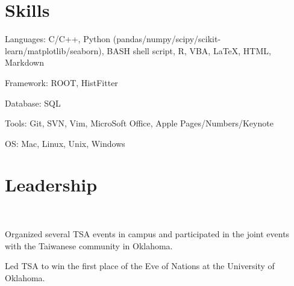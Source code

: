 \documentclass[letterpaper]{deedy-resume-openfont}
\begin{document}

\section{Skills}
\location{}
\begin{tightemize}
\item Languages: C/C++, Python (pandas/numpy/scipy/scikit-learn/matplotlib/seaborn), BASH shell script, R, VBA, \LaTeX, HTML, Markdown
\item Framework: ROOT, HistFitter
\item Database: SQL
\item Tools: Git, SVN, Vim, MicroSoft Office, Apple Pages/Numbers/Keynote
\item OS: Mac, Linux, Unix, Windows
\end{tightemize}
\sectionsep



\section{Leadership}

\\
\begin{tightemize}
\item Organized several TSA events in campus and participated in the joint events with the Taiwanese community in Oklahoma.
\item Led TSA to win the first place of the Eve of Nations at the University of Oklahoma.
\end{tightemize}
\sectionsep
\end{document}

